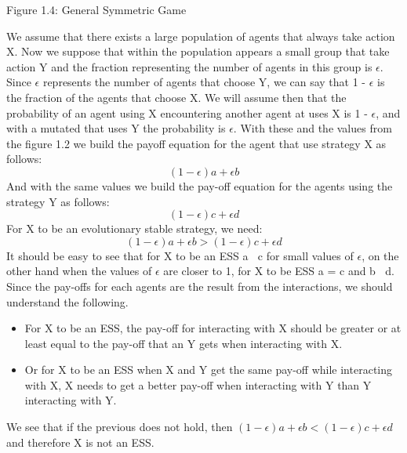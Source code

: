 \documentclass{article}
\begin{document}
\begin{center}
	Figure 1.4: General Symmetric Game
\end{center}
We assume that there exists a large population of agents that always take action X. Now we suppose that within the population appears a small group that take action Y and the   fraction representing the number of agents in this group is $\epsilon$.  Since $\epsilon$ represents the number of agents that choose Y, we can say that 1 - $\epsilon$ is the fraction of the agents that choose X.  We will assume then that the probability of an agent using X encountering another agent at uses X is 1 - $\epsilon$, and with a mutated that uses Y the probability is $\epsilon$.  With these and the values from the figure 1.2 we build the payoff equation for the agent that use strategy X as follows:
\begin{equation}
(1-{\epsilon})a + {\epsilon}b
\end{equation}
And with the same values we build the pay-off equation for the agents using the strategy Y as follows:
\begin{equation}
(1-{\epsilon})c + {\epsilon}d
\end{equation}
For X to be an evolutionary stable strategy, we need:
\begin{equation}
(1-{\epsilon})a + {\epsilon}b > (1-{\epsilon})c + {\epsilon}d
\end{equation}
It should be easy to see that for X to be an ESS a $\>$ c for small values of $\epsilon$, on the other hand when the values of $\epsilon$ are closer to 1, for X to be ESS a = c and b $\>$ d.
Since the pay-offs for each agents are the result from the interactions, we should understand the following.
\begin{itemize}
\item For X to be an ESS, the pay-off for interacting with X should be greater or at least equal to the pay-off that an Y gets when interacting with X.
\item Or for X to be an ESS when X and Y get the same pay-off while interacting with X, X needs to get a better pay-off when interacting with Y than Y interacting with Y.
\end{itemize}
We see that if the previous does not hold, then $(1-{\epsilon})a + {\epsilon}b < (1-{\epsilon})c + {\epsilon}d$ and therefore X is not an ESS.
\end{document}
